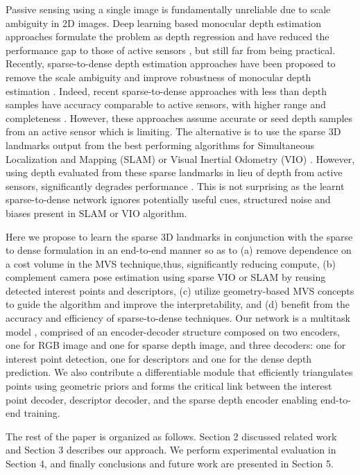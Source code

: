 \documentclass[runningheads]{llncs}
\begin{document}
Passive sensing using a single image is fundamentally unreliable due to scale ambiguity in 2D images. Deep learning based monocular depth estimation approaches formulate the problem as depth regression \cite{eigen2015predicting,fu2018deep} and have reduced the performance gap to those of active sensors \cite{lee2019big,lasinger2019towards}, but still far from being practical. Recently, sparse-to-dense depth estimation approaches have been proposed to remove the scale ambiguity and improve robustness of monocular depth estimation \cite{Ma2017SparseToDense}. Indeed, recent sparse-to-dense approaches with less than  depth samples have accuracy comparable to active sensors, with higher range and completeness \cite{chen2018estimating} . However, these approaches assume accurate or seed depth samples from an active sensor which is limiting. The alternative is to use the sparse 3D landmarks output from the best performing algorithms for Simultaneous Localization and Mapping (SLAM) \cite{mur2015orb} or Visual Inertial Odometry (VIO) \cite{nister2004visual}. However, using depth evaluated from these sparse landmarks in lieu of depth from active sensors, significantly degrades performance \cite{deep2018funk}. This is not surprising as the learnt sparse-to-dense network ignores potentially useful cues, structured noise and biases present in SLAM or VIO algorithm. 

Here we propose to learn the sparse 3D landmarks in conjunction with the sparse to dense formulation in an end-to-end manner so as to (a) remove dependence on a cost volume in the MVS technique,thus, significantly reducing compute, (b) complement camera pose estimation using sparse VIO or SLAM by reusing detected interest points and descriptors, (c) utilize  geometry-based MVS concepts to guide the algorithm and improve the interpretability,  and (d) benefit from the accuracy and efficiency of sparse-to-dense techniques. Our network is a multitask model \cite{kendall2018multi}, comprised of an encoder-decoder structure composed on two encoders, one for RGB image and one for sparse depth image, and three decoders: one for interest point detection, one for descriptors and one for the dense depth prediction. We also contribute a differentiable module that efficiently triangulates points using geometric priors and forms the critical link between the interest point decoder, descriptor decoder, and the sparse depth encoder enabling end-to-end training.   
 
The rest of the paper is organized as follows. Section 2 discussed related work and Section 3 describes our approach. We perform experimental evaluation in Section 4, and finally conclusions and future work are presented in Section 5. 
\end{document}
